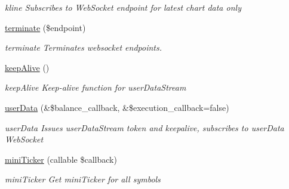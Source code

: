 \begin{DoxyCompactItemize}
\begin{DoxyCompactList}\small\item\em kline Subscribes to  Web\-Socket endpoint for latest chart data only \end{DoxyCompactList}\item 
\hyperlink{classBinance_1_1API_a67ed560d60527ad64f16253069cb1b14}{terminate} (\$endpoint)
\begin{DoxyCompactList}\small\item\em terminate Terminates websocket endpoints. \end{DoxyCompactList}\item 
\hyperlink{classBinance_1_1API_a2a29ca9ab18d04ff2e42aa6e5e0ce312}{keep\-Alive} ()
\begin{DoxyCompactList}\small\item\em keep\-Alive Keep-\/alive function for user\-Data\-Stream \end{DoxyCompactList}\item 
\hyperlink{classBinance_1_1API_af033a40a6a86ad422c58d67dc57bb0fd}{user\-Data} (\&\$balance\-\_\-callback, \&\$execution\-\_\-callback=false)
\begin{DoxyCompactList}\small\item\em user\-Data Issues user\-Data\-Stream token and keepalive, subscribes to user\-Data Web\-Socket \end{DoxyCompactList}\item 
\hyperlink{classBinance_1_1API_af115a75377eb89f33d7beb488f5bb7c5}{mini\-Ticker} (callable \$callback)
\begin{DoxyCompactList}\small\item\em mini\-Ticker Get mini\-Ticker for all symbols \end{DoxyCompactList}\end{DoxyCompactItemize}
